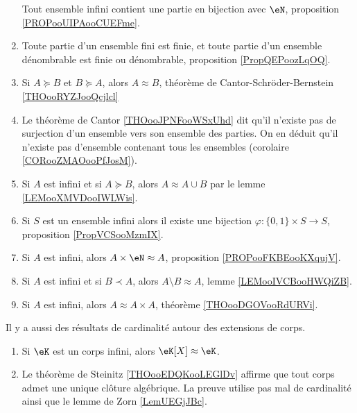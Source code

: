\begin{enumerate}
	      Tout ensemble infini contient une partie en bijection avec \( \eN\), proposition \ref{PROPooUIPAooCUEFme}.
	\item
	      Toute partie d'un ensemble fini est finie, et toute partie d'un ensemble dénombrable est finie ou dénombrable, proposition \ref{PropQEPoozLqOQ}.
	\item
	      Si \( A\succeq B\) et \( B\succeq A\), alors \( A\approx B\), théorème de Cantor-Schröder-Bernstein \ref{THOooRYZJooQcjlcl}
	\item
	      Le théorème de Cantor \ref{THOooJPNFooWSxUhd} dit qu'il n'existe pas de surjection d'un ensemble vers son ensemble des parties. On en déduit qu'il n'existe pas d'ensemble contenant tous les ensembles (corolaire \ref{CORooZMAOooPfJosM}).
	\item
	      Si \( A\) est infini et si \( A\succeq B\), alors \( A\approx A\cup B\) par le lemme \ref{LEMooXMVDooIWLWis}.
	\item
	      Si \( S\) est un ensemble infini alors il existe une bijection \( \varphi\colon \{ 0,1 \}\times S\to S\), proposition \ref{PropVCSooMzmIX}.
	\item
	      Si \( A\) est infini, alors \( A\times \eN\approx A\), proposition \ref{PROPooFKBEooKXqujV}.
	\item
	      Si \( A\) est infini et si \( B\prec A\), alors \( A\setminus B\approx A\), lemme \ref{LEMooIVCBooHWQiZB}.
	\item
	      Si \( A\) est infini, alors \( A\approx A\times A\), théorème \ref{THOooDGOVooRdURVi}.
\end{enumerate}

Il y a aussi des résultats de cardinalité autour des extensions de corps.
\begin{enumerate}
	\item
	      Si \( \eK\) est un corps infini, alors \( \eK[X]\approx \eK\).
	\item
	      Le théorème de Steinitz \ref{THOooEDQKooLEGlDv} affirme que tout corps admet une unique clôture algébrique. La preuve utilise pas mal de cardinalité ainsi que le lemme de Zorn \ref{LemUEGjJBc}.
\end{enumerate}
